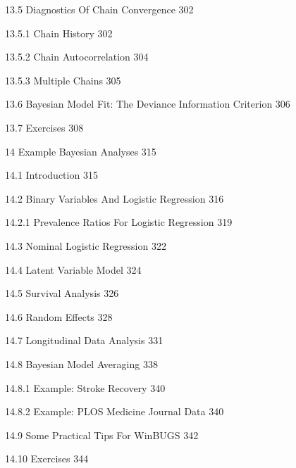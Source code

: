 13.5 Diagnostics Of Chain Convergence 302



13.5.1 Chain History 302



13.5.2 Chain Autocorrelation 304



13.5.3 Multiple Chains 305



13.6 Bayesian Model Fit: The Deviance Information Criterion 306



13.7 Exercises 308



14 Example Bayesian Analyses 315



14.1 Introduction 315



14.2 Binary Variables And Logistic Regression 316



14.2.1 Prevalence Ratios For Logistic Regression 319



14.3 Nominal Logistic Regression 322



14.4 Latent Variable Model 324



14.5 Survival Analysis 326



14.6 Random Effects 328



14.7 Longitudinal Data Analysis 331



14.8 Bayesian Model Averaging 338



14.8.1 Example: Stroke Recovery 340



14.8.2 Example: PLOS Medicine Journal Data 340



14.9 Some Practical Tips For WinBUGS 342



14.10 Exercises 344

